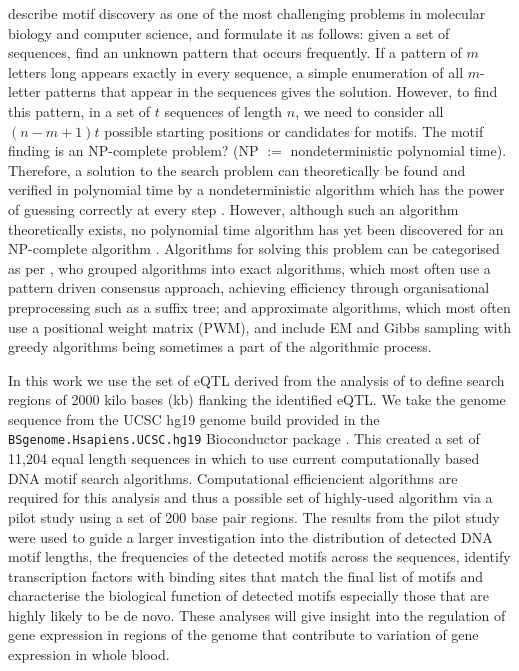 \documentclass[12pt, onecolumn, oneside]{gsajnl}
\begin{document}
\citet{das2007survey} describe motif discovery as one of the most challenging problems in molecular biology and computer science, and formulate it as follows:
given a set of sequences, find an unknown pattern that occurs frequently. If a pattern of $m$ letters long appears exactly in every sequence, a simple enumeration of all $m$-letter patterns that appear in the sequences gives the solution.
However, to find this pattern, in a set of $t$ sequences of length $n$, we need to consider all $(n - m +1)t$ possible starting positions or candidates for motifs. The motif finding is an NP-complete problem? \citep{tran2014survey} (NP $:=$ nondeterministic polynomial time). Therefore, a solution to the search problem can theoretically be found and verified in polynomial time by a nondeterministic algorithm which has the power of guessing correctly at every step \citep{dasgupta2006algorithms}. However, although such an algorithm theoretically exists, no polynomial time algorithm has yet been discovered for an NP-complete algorithm \citep{cormen2009introduction}.  Algorithms for solving this problem can be categorised as per \citet{sun2015affinity}, who grouped algorithms into exact algorithms, which most often use a pattern driven consensus approach, achieving efficiency through organisational preprocessing such as a suffix tree; and approximate algorithms, which most often use a positional weight matrix (PWM), and include EM and Gibbs sampling with greedy algorithms being sometimes a part of the algorithmic process.


In this work we use the set of eQTL derived from the analysis of \citet{lloyd2017genetic} to define search regions of 2000 kilo bases (kb) flanking the identified eQTL. We take
the genome sequence from the UCSC hg19 genome build provided in the \texttt{BSgenome.Hsapiens}\newline\texttt{.UCSC.hg19} Bioconductor package \citep{hg19_ucsc}. This created a set of 11,204 equal length sequences in which to use current computationally based DNA motif search algorithms.    
Computational efficiencient algorithms are required for this analysis and thus a possible set of highly-used algorithm via a pilot
study using a set of 200 base pair regions. The results from the pilot study were used to guide a larger investigation into the distribution of detected DNA motif lengths, the frequencies of
the detected motifs across the sequences, identify transcription factors with binding sites that match the final list of motifs and characterise the biological
function of detected motifs especially those that are highly likely to be de novo. These analyses will give insight into the regulation of gene expression in
regions of the genome that contribute to variation of gene expression in whole blood. 
\end{document}
